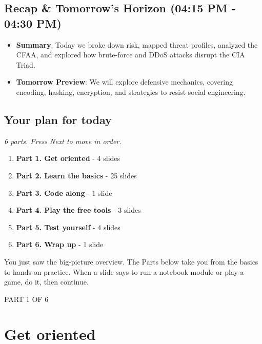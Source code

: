 \documentclass[12pt,openany]{book}
\begin{document}
\medskip

\subsection*{Recap \& Tomorrow's Horizon (04:15 PM - 04:30 PM)}


\begin{itemize}

  \item \textbf{Summary}: Today we broke down risk, mapped threat profiles, analyzed the CFAA, and explored how brute-force and DDoS attacks disrupt the CIA Triad.

  \item \textbf{Tomorrow Preview}: We will explore defensive mechanics, covering encoding, hashing, encryption, and strategies to resist social engineering.

\end{itemize}

\medskip

\subsection*{Your plan for today}
{\small\itshape\color{gray}6 parts. Press Next to move in order.}


\begin{enumerate}
  \item \textbf{Part 1. Get oriented} - 4 slides
  \item \textbf{Part 2. Learn the basics} - 25 slides
  \item \textbf{Part 3. Code along} - 1 slide
  \item \textbf{Part 4. Play the free tools} - 3 slides
  \item \textbf{Part 5. Test yourself} - 4 slides
  \item \textbf{Part 6. Wrap up} - 1 slide
\end{enumerate}

You just saw the big-picture overview. The Parts below take you from the basics to hands-on practice. When a slide says to run a notebook module or play a game, do it, then continue.

\medskip

\vspace{4pt}\noindent\textsc{PART 1 OF 6}


\section*{Get oriented}
\end{document}
